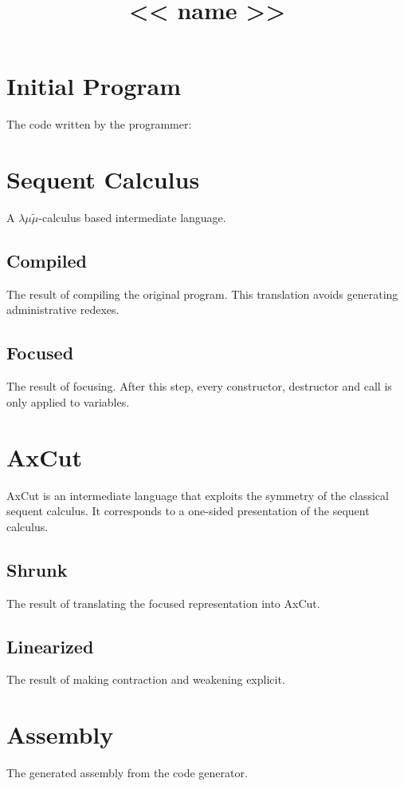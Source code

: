 \documentclass[12pt]{scrartcl}
\date{}
\title{<< name >>}
\begin{document}
\maketitle

\section*{Initial Program}
The code written by the programmer:


\section*{Sequent Calculus}
A $\lambda\mu\tilde\mu$-calculus based intermediate language.

\subsection*{Compiled}
The result of compiling the original program.
This translation avoids generating administrative redexes.



\subsection*{Focused}
The result of focusing. After this step, every constructor, destructor and call is only applied to variables.



\section*{AxCut}
AxCut is an intermediate language that exploits the symmetry of the classical sequent calculus. It corresponds to a one-sided presentation of the sequent calculus.

\subsection*{Shrunk}
The result of translating the focused representation into AxCut.



\subsection*{Linearized}
The result of making contraction and weakening explicit.



\section*{Assembly}
The generated assembly from the code generator.

\end{document}
